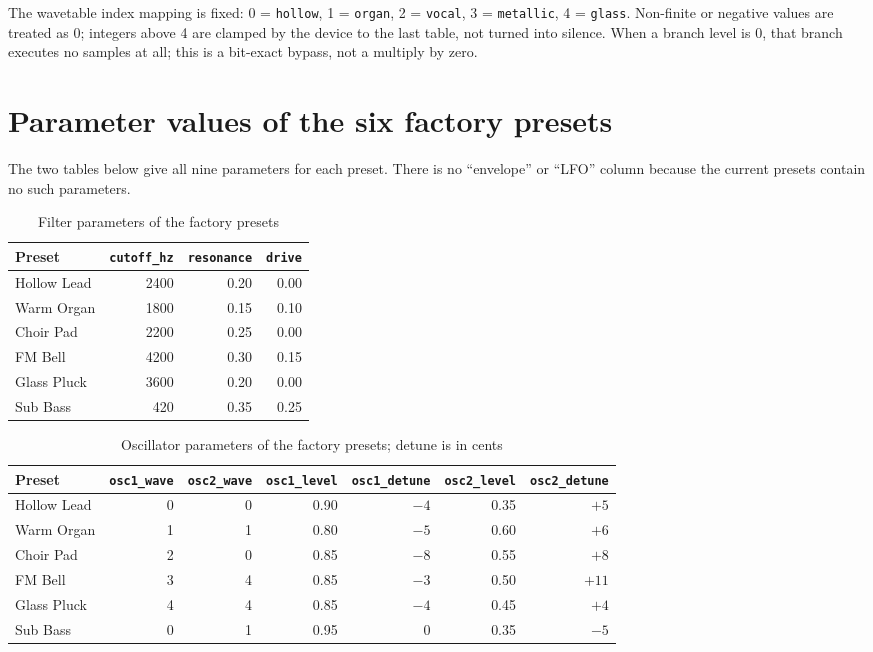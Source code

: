 
The wavetable index mapping is fixed: 0 = \texttt{hollow}, 1 = \texttt{organ},
2 = \texttt{vocal}, 3 = \texttt{metallic}, 4 = \texttt{glass}. Non-finite or
negative values are treated as 0; integers above 4 are clamped by the device to
the last table, not turned into silence. When a branch level is 0, that branch
executes no samples at all; this is a bit-exact bypass, not a multiply by zero.

\section{Parameter values of the six factory presets}

The two tables below give all nine parameters for each preset. There is no
``envelope'' or ``LFO'' column because the current presets contain no such
parameters.

\begin{table}[htbp]
\centering
\small
\begin{tabular}{@{}lrrr@{}}
\hline
Preset & \texttt{cutoff\_hz} & \texttt{resonance} & \texttt{drive} \\
\hline
Hollow Lead & 2400 & 0.20 & 0.00 \\
Warm Organ & 1800 & 0.15 & 0.10 \\
Choir Pad & 2200 & 0.25 & 0.00 \\
FM Bell & 4200 & 0.30 & 0.15 \\
Glass Pluck & 3600 & 0.20 & 0.00 \\
Sub Bass & 420 & 0.35 & 0.25 \\
\hline
\end{tabular}
\caption{Filter parameters of the factory presets}
\label{tab:preset-filter}
\end{table}

\begin{table}[htbp]
\centering
\small
\begin{tabular}{@{}lrrrrrr@{}}
\hline
Preset & \texttt{osc1\_wave} & \texttt{osc2\_wave} & \texttt{osc1\_level} & \texttt{osc1\_detune} & \texttt{osc2\_level} & \texttt{osc2\_detune} \\
\hline
Hollow Lead & 0 & 0 & 0.90 & $-4$ & 0.35 & $+5$ \\
Warm Organ & 1 & 1 & 0.80 & $-5$ & 0.60 & $+6$ \\
Choir Pad & 2 & 0 & 0.85 & $-8$ & 0.55 & $+8$ \\
FM Bell & 3 & 4 & 0.85 & $-3$ & 0.50 & $+11$ \\
Glass Pluck & 4 & 4 & 0.85 & $-4$ & 0.45 & $+4$ \\
Sub Bass & 0 & 1 & 0.95 & $0$ & 0.35 & $-5$ \\
\hline
\end{tabular}
\caption{Oscillator parameters of the factory presets; detune is in cents}
\label{tab:preset-osc}
\end{table}

